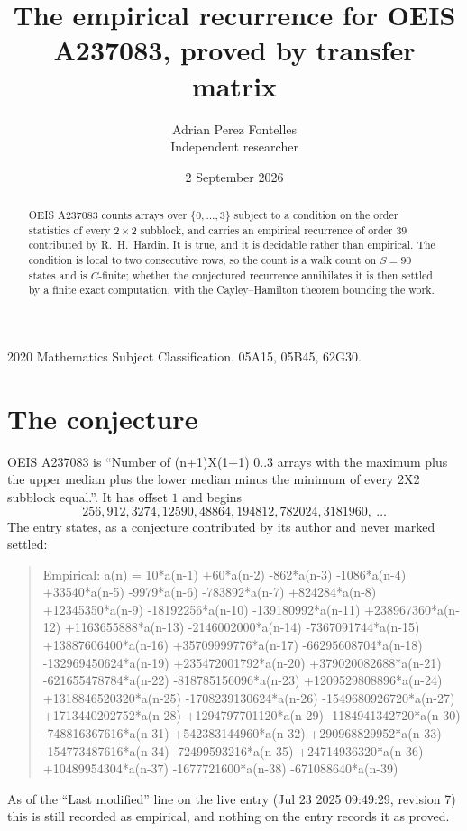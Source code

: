 \documentclass[11pt,a4paper]{article}
\title{The empirical recurrence for OEIS A237083, proved by transfer matrix}
\author{Adrian Perez Fontelles\\ \small Independent researcher}
\date{2 September 2026}
\theoremstyle{plain}
\theoremstyle{definition}
\begin{document}
\maketitle

\begin{abstract}
OEIS A237083 counts arrays over $\{0,\dots,3\}$ subject to a condition on the order
statistics of every $2\times2$ subblock, and carries an empirical recurrence of order
$39$ contributed by R.~H.~Hardin. It is true, and it is decidable rather than empirical.
The condition is local to two consecutive rows, so the count is a walk count on $S=90$
states and is $C$-finite; whether the conjectured recurrence annihilates it is then settled by
a finite exact computation, with the Cayley--Hamilton theorem bounding the work.
\end{abstract}

\noindent\small 2020 Mathematics Subject Classification. 05A15, 05B45, 62G30.\normalsize

\section{The conjecture}

OEIS A237083 is ``Number of (n+1)X(1+1) 0..3 arrays with the maximum plus the upper median plus the lower median minus the minimum of every 2X2 subblock equal.''. It has offset $1$ and begins
\[
256, 912, 3274, 12590, 48864, 194812, 782024, 3181960,\ \dots
\]
The entry states, as a conjecture contributed by its author and never marked settled:
\begin{quote}
Empirical: a(n) = 10*a(n-1) +60*a(n-2) -862*a(n-3) -1086*a(n-4) +33540*a(n-5) -9979*a(n-6) -783892*a(n-7) +824284*a(n-8) +12345350*a(n-9) -18192256*a(n-10) -139180992*a(n-11) +238967360*a(n-12) +1163655888*a(n-13) -2146002000*a(n-14) -7367091744*a(n-15) +13887606400*a(n-16) +35709999776*a(n-17) -66295608704*a(n-18) -132969450624*a(n-19) +235472001792*a(n-20) +379020082688*a(n-21) -621655478784*a(n-22) -818785156096*a(n-23) +1209529808896*a(n-24) +1318846520320*a(n-25) -1708239130624*a(n-26) -1549680926720*a(n-27) +1713440202752*a(n-28) +1294797701120*a(n-29) -1184941342720*a(n-30) -748816367616*a(n-31) +542383144960*a(n-32) +290968829952*a(n-33) -154773487616*a(n-34) -72499593216*a(n-35) +24714936320*a(n-36) +10489954304*a(n-37) -1677721600*a(n-38) -671088640*a(n-39)
\end{quote}
As of the ``Last modified'' line on the live entry (Jul 23 2025 09:49:29, revision 7) this is still
recorded as empirical, and nothing on the entry records it as proved.
\end{document}
